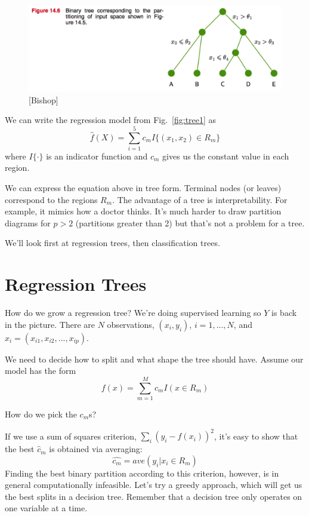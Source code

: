 \documentclass[a4paper]{article}
\begin{document}
\begin{figure}
\centering
\includegraphics[width=1.0\textwidth]{fig14_6.png}
\caption{\label{fig:tree3}[Bishop]}
\end{figure}

We can write the regression model from Fig.~\ref{fig:tree1} as 
$$
\hat{f}(X) = \sum_{i=1}^5 c_m I\{(x_1,x_2) \in R_m\}
$$
where $I\{\cdot\}$ is an indicator function and $c_m$ gives us the constant value in each region.

We can express the equation above in tree form.  Terminal nodes (or leaves) correspond to the regions $R_m$.  The advantage of a tree is interpretability.  For example, it mimics how a doctor thinks.  It's much harder to draw partition diagrams for $p>2$ (partitions greater than 2) but that's not a problem for a tree.

We'll look first at regression trees, then classification trees.

\section{Regression Trees}

How do we grow a regression tree?  We're doing supervised learning so $Y$ is back in the picture.  There are $N$ observations, $( {x_i}, y_i)$, $i = 1, ..., N$, and $ {x_i} = (x_{i1}, x_{i2}, ..., x_{ip})$.

We need to decide how to split and what shape the tree should have.  Assume our model has the form
$$
f({x}) = \sum_{m=1}^{M} c_m I({x} \in R_m)
$$

How do we pick the $c_m$s?

If we use a sum of squares criterion, $\sum_i (y_i-f({x_i}))^2$, it's easy to show that the best $\hat{c}_m$ is obtained via averaging:
$$
\hat{c_m} = ave(y_i | {x_i} \in R_m)
$$
Finding the best binary partition according to this criterion, however, is in general computationally infeasible.  Let's try a greedy approach, which will get us the best splits in a decision tree. Remember that a decision tree only operates on one  variable at a time.
\end{document}

